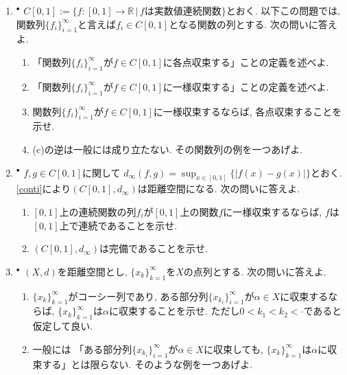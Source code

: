 \documentclass[dvipdfmx,a4paper,11pt]{article}
\newcommand{\R}{\mathbb{R}}
\theoremstyle{definition}
\begin{document}
\begin{enumerate}[label=\textbf{問}\ref*{sec-completion}.\arabic*]
	\setlength{\parskip}{0cm} 
  \setlength{\itemsep}{7pt} 


\item \label{uniform} $^{\bullet}$  $C[0,1] := \{ f : [0,1] \rightarrow \R \,|\, \text{$f$は実数値連続関数}\}$とおく. 以下この問題では, 関数列$\{ f_{i}\}_{i=1}^{\infty}$と言えば$f_i \in C[0,1]$となる関数の列とする. 次の問いに答えよ.
\begin{enumerate}
\setlength{\parskip}{0cm}
  \setlength{\itemsep}{0pt} 
\item 「関数列$\{ f_{i}\}_{i=1}^{\infty}$が$f \in C[0,1]$に各点収束する」ことの定義を述べよ.
\item 「関数列$\{ f_{i}\}_{i=1}^{\infty}$が$f \in C[0,1]$に一様収束する」ことの定義を述べよ. 
\item 関数列$\{ f_{i}\}_{i=1}^{\infty}$が$f \in C[0,1]$に一様収束するならば, 各点収束することを示せ. 
\item (c)の逆は一般には成り立たない. その関数列の例を一つあげよ.
\end{enumerate}

\item $^{\bullet}$  \label{uniform_2}$f,g \in C[0,1]$に関して
$
d_{\infty}(f,g)=\sup_{x \in [0,1] }\{ |f(x) - g(x)|\}
$とおく.
\ref{conti}により$(C[0,1], d_{\infty})$は距離空間になる. 
次の問いに答えよ.
\begin{enumerate}
\setlength{\parskip}{0cm}
  \setlength{\itemsep}{0pt} 
  \item $[0,1]$上の連続関数の列$f_{i}$が$[0,1]$上の関数$f$に一様収束するならば, $f$は$[0,1]$上で連続であることを示せ. 
\item $(C[0,1], d_{\infty})$は完備であることを示せ.
\end{enumerate}

\item $^{\bullet}$  $(X,d)$を距離空間とし, $\{ x_{k}\}_{k=1}^{\infty}$を$X$の点列とする. 次の問いに答えよ.
\begin{enumerate}
\setlength{\parskip}{0cm}
  \setlength{\itemsep}{0pt} 
 \item $\{ x_{k}\}_{k=1}^{\infty}$がコーシー列であり, ある部分列$\{ x_{k_{i}}\}_{i=1}^{\infty}$が$\alpha \in X$に収束するならば, $\{ x_{k}\}_{k=1}^{\infty}$は$\alpha$に収束することを示せ. ただし$0<k_1<k_2<\cdot$であると仮定して良い. 
 \item 一般には 「ある部分列$\{ x_{k_{i}}\}_{i=1}^{\infty}$が$\alpha \in X$に収束しても, $\{ x_{k}\}_{k=1}^{\infty}$は$\alpha$に収束する」とは限らない. そのような例を一つあげよ. 
  \end{enumerate}


\end{enumerate}
\end{document}
